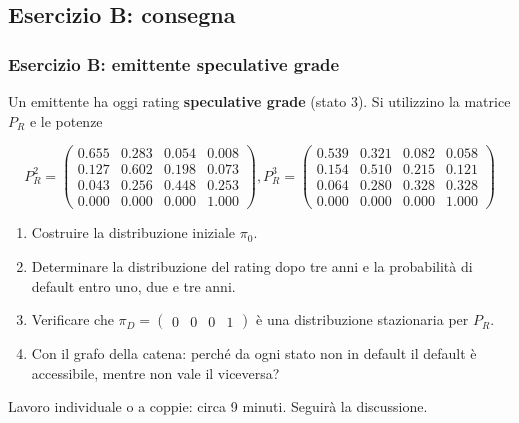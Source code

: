 \documentclass[handout]{beamer}%
\providecommand{\QTR}[2]{\csname #1\endcsname{#2}}
\begin{document}
\subsection{Esercizio B: consegna}%

\begin{frame}%
%

\frametitle{Esercizio B: emittente speculative grade}%
%

%


Un emittente ha oggi rating \textbf{speculative grade} (stato $3$). Si
utilizzino la matrice $P_{R}$ e le potenze

{\small
\[
P_{R}^{2} =
\begin{pmatrix}
0.655 & 0.283 & 0.054 & 0.008\\
0.127 & 0.602 & 0.198 & 0.073\\
0.043 & 0.256 & 0.448 & 0.253\\
0.000 & 0.000 & 0.000 & 1.000
\end{pmatrix}
, P_{R}^{3} =
\begin{pmatrix}
0.539 & 0.321 & 0.082 & 0.058\\
0.154 & 0.510 & 0.215 & 0.121\\
0.064 & 0.280 & 0.328 & 0.328\\
0.000 & 0.000 & 0.000 & 1.000
\end{pmatrix}
\]
}

\medskip

\begin{enumerate}
\item[1.] Costruire la distribuzione iniziale $\pi_{0}$.

\item[2.] Determinare la distribuzione del rating dopo tre anni e la
probabilit\`{a} di default entro uno, due e tre anni.

\item[3.] Verificare che $\pi_{D}=
\begin{pmatrix}
0 & 0 & 0 & 1
\end{pmatrix}
$ \`{e} una distribuzione stazionaria per $P_{R}$.

\item[4.] Con il grafo della catena: perch\'{e} da ogni stato non in default
il default \`{e} accessibile, mentre non vale il viceversa?
\end{enumerate}

\medskip

\begin{center}
{\small Lavoro individuale o a coppie: circa 9 minuti. Seguir\`{a} la
discussione.}
\end{center}%

\transboxout
\end{frame}%
\end{document}
